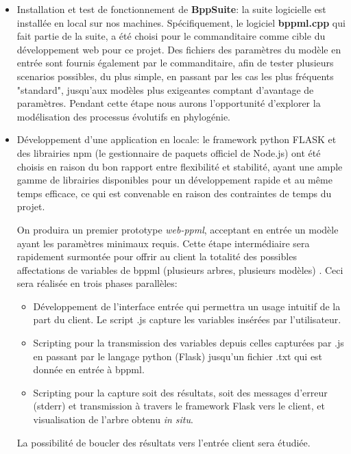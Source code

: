 \begin{itemize}
	\item Installation et test de fonctionnement de \textbf{BppSuite}: la suite logicielle est installée en local sur nos machines. 
	Spécifiquement, le logiciel \textbf{bppml.cpp} qui fait partie de la suite, a été choisi pour le commanditaire comme cible 
	du développement web pour ce projet. Des fichiers des paramètres du modèle en entrée sont fournis également par le commanditaire, 
	afin de tester plusieurs scenarios possibles, du plus simple, en passant par les cas les plus fréquents "standard", 
	jusqu'aux modèles plus exigeantes comptant d'avantage de paramètres. Pendant cette étape nous aurons l'opportunité d'explorer
	 la modélisation des processus évolutifs en phylogénie.
	
	\item Développement d'une application en locale: le framework python FLASK et des librairies npm 
	(le gestionnaire de paquets officiel de Node.js) 
	ont été choisis en raison du bon rapport entre flexibilité et stabilité, 
	ayant une ample gamme de librairies disponibles pour un développement rapide et au même temps efficace, 
	ce qui est convenable en raison des contraintes de temps du projet.

	On produira un premier prototype  \textit{web-ppml}, acceptant en entrée un modèle ayant les paramètres minimaux requis. 
	Cette étape intermédiaire sera rapidement surmontée pour offrir au client la totalité des possibles affectations 
	de variables de bppml (plusieurs arbres, plusieurs modèles) .
	Ceci sera réalisée en trois phases parallèles:
	\begin{itemize}
		\item Développement de l'interface entrée qui permettra un usage intuitif de la part du client. 
		Le script .js capture les variables insérées par l'utilisateur. 
		\item Scripting pour la transmission des variables depuis celles capturées par .js en passant par le langage 
		python (Flask) jusqu'un fichier .txt qui est donnée en entrée à bppml.
		\item Scripting pour la capture soit des résultats, soit des messages d'erreur (stderr) et transmission à travers 
		le framework Flask vers le client, et visualisation de l'arbre obtenu \textit{in situ}. 
	\end{itemize}
	
	La possibilité de boucler des résultats vers l'entrée client sera étudiée.
	 

\end{itemize}
